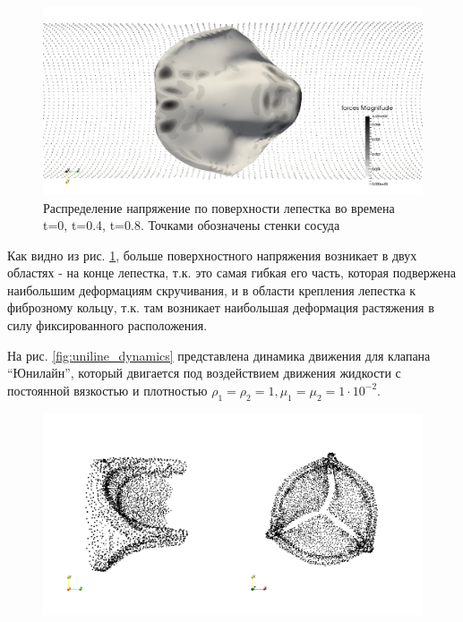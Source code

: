\begin{figure}[htbp]
\centering
\includegraphics{ideal_valve_stress_3.png}
\caption{\label{fig:ideal_valve_stress}Распределение напряжение по
поверхности лепестка во времена t=0, t=0.4, t=0.8. Точками обозначены
стенки сосуда}
\end{figure}

Как видно из рис. \ref{fig:ideal_valve_stress}, больше поверхностного
напряжения возникает в двух областях - на конце лепестка, т.к. это самая
гибкая его часть, которая подвержена наибольшим деформациям скручивания,
и в области крепления лепестка к фиброзному кольцу, т.к. там возникает
наибольшая деформация растяжения в силу фиксированного расположения.

На рис. \ref{fig:uniline_dynamics} представлена динамика движения для
клапана ``Юнилайн'', который двигается под воздействием движения
жидкости с постоянной вязкостью и плотностью
\(\rho_1=\rho_2=1, \mu_1=\mu_2=1 \cdot 10^{-2}\).

\begin{figure}[htbp]
\centering
\includegraphics{uniline_dynamics_11.png}
\caption{}
\end{figure}

